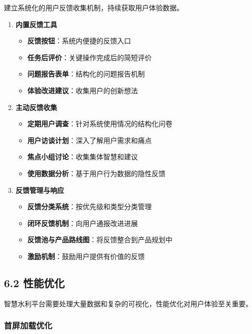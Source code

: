 建立系统化的用户反馈收集机制，持续获取用户体验数据。

\begin{enumerate}
\def\labelenumi{\arabic{enumi}.}
\tightlist
\item
  \textbf{内置反馈工具}

  \begin{itemize}
  \tightlist
  \item
    \textbf{反馈按钮}：系统内便捷的反馈入口
  \item
    \textbf{任务后评价}：关键操作完成后的简短评价
  \item
    \textbf{问题报告表单}：结构化的问题报告机制
  \item
    \textbf{体验改进建议}：收集用户的创新想法
  \end{itemize}
\item
  \textbf{主动反馈收集}

  \begin{itemize}
  \tightlist
  \item
    \textbf{定期用户调查}：针对系统使用情况的结构化问卷
  \item
    \textbf{用户访谈计划}：深入了解用户需求和痛点
  \item
    \textbf{焦点小组讨论}：收集集体智慧和建议
  \item
    \textbf{使用数据分析}：基于用户行为数据的隐性反馈
  \end{itemize}
\item
  \textbf{反馈管理与响应}

  \begin{itemize}
  \tightlist
  \item
    \textbf{反馈分类系统}：按优先级和类型分类管理
  \item
    \textbf{闭环反馈机制}：向用户通报改进进展
  \item
    \textbf{反馈池与产品路线图}：将反馈整合到产品规划中
  \item
    \textbf{激励机制}：鼓励用户提供有价值的反馈
  \end{itemize}
\end{enumerate}

\subsection{6.2 性能优化}\label{ux6027ux80fdux4f18ux5316}

智慧水利平台需要处理大量数据和复杂的可视化，性能优化对用户体验至关重要。

\subsubsection{首屏加载优化}\label{ux9996ux5c4fux52a0ux8f7dux4f18ux5316}

